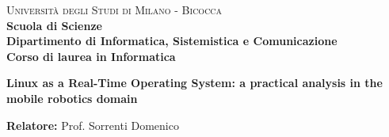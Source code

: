 %
%

\begin{titlepage}

    \noindent
    \begin{minipage}[t]{0.19\textwidth}
    \end{minipage}
    \begin{minipage}[t]{0.81\textwidth}
        {
            {\textsc{Università degli Studi di Milano - Bicocca}} \\
            \textbf{Scuola di Scienze} \\
            \textbf{Dipartimento di Informatica, Sistemistica e Comunicazione} \\
            \textbf{Corso di laurea in Informatica} \\
            \par
        }
    \end{minipage}

    \vspace{35mm}

    \begin{center}
        {\Huge{
                \textbf{Linux as a Real-Time Operating System: a practical analysis in the mobile robotics domain}
                \par
            }
        }
    \end{center}

    \vspace{30mm}

    \noindent
    {\large \textbf{Relatore:} Prof. Sorrenti Domenico } \\


\end{titlepage}
